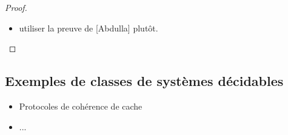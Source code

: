 \documentclass[a4paper, twoside]{scrartcl}
\theoremstyle{plain}%
\theoremstyle{definition}
\theoremstyle{remark}
\begin{document}
\begin{proof}
\begin{itemize}
  \item utiliser la preuve de [Abdulla] plutôt.
  \end{itemize}

\end{proof}


\subsection{Exemples de classes de systèmes décidables}

\begin{itemize}
\item Protocoles de cohérence de cache
\item ...
\end{itemize}
\end{document}
